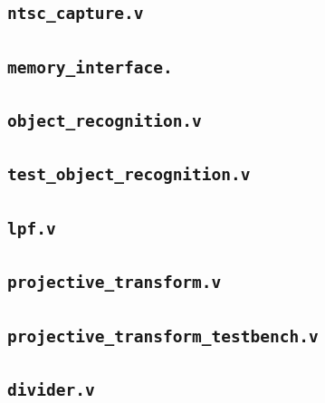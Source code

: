 \documentclass[10pt]{article}
\begin{document}
\subsection{{\tt ntsc\_capture.v}}
	  	

\subsection{{\tt memory\_interface.}}
	  	

	  	
\subsection{{\tt object\_recognition.v}}
	  	


\subsection{{\tt test\_object\_recognition.v}}


	  	
\subsection{{\tt lpf.v}}
	  	

	  	
\subsection{{\tt projective\_transform.v}}
	  	


\subsection{{\tt projective\_transform\_testbench.v}}


	  	
\subsection{{\tt divider.v}}
	  	
\end{document}
